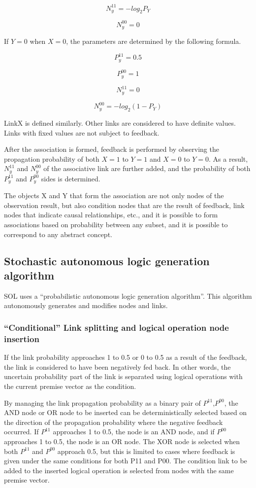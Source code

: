 \documentclass[12pt]{article}
\begin{document}
\[ N_y^{11}= -log_2 P_Y \]

\[ N_y^{00}= 0\]

If \(Y=0\) when \(X=0\), the parameters are determined by the following
formula.

\[ P_y^{11}=0.5\]

\[ P_y^{00}=1\]

\[ N_y^{11}= 0\]

\[ N_y^{00}= -log_2 (1-P_Y) \]

LinkX is defined similarly. Other links are considered to have definite
values. Links with fixed values are not subject to feedback.

After the association is formed, feedback is performed by observing the
propagation probability of both \(X=1\) to \(Y=1\) and \(X=0\) to
\(Y=0\). As a result, \(N_y^{11}\) and \(N_y^{00}\) of the associative
link are further added, and the probability of both \(P_y^{11}\) and
\(P_y^{00}\) sides is determined.

The objects X and Y that form the association are not only nodes of the
observation result, but also condition nodes that are the result of
feedback, link nodes that indicate causal relationships, etc., and it is
possible to form associations based on probability between any subset,
and it is possible to correspond to any abstract concept.

\subsection{Stochastic autonomous logic generation
algorithm}\label{stochastic-autonomous-logic-generation-algorithm}

SOL uses a ``probabilistic autonomous logic generation algorithm''. This
algorithm autonomously generates and modifies nodes and links.

\subsubsection{``Conditional'' Link splitting and logical
operation node
insertion}\label{conditional-link-splitting-and-logical-operation-node-insertion}

If the link probability approaches 1 to 0.5 or 0 to 0.5 as a result of
the feedback, the link is considered to have been negatively fed back.
In other words, the uncertain probability part of the link is separated
using logical operations with the current premise vector as the
condition.

By managing the link propagation probability as a binary pair of
\(P^{11}\),\(P^{00}\), the AND node or OR node to be inserted can be
deterministically selected based on the direction of the propagation
probability where the negative feedback occurred. If \(P^{11}\)
approaches 1 to 0.5, the node is an AND node, and if \(P^{00}\)
approaches 1 to 0.5, the node is an OR node. The XOR node is selected
when both \(P^{11}\) and \(P^{00}\) approach 0.5, but this is limited to
cases where feedback is given under the same conditions for both P11 and
P00. The condition link to be added to the inserted logical operation is
selected from nodes with the same premise vector.
\end{document}
